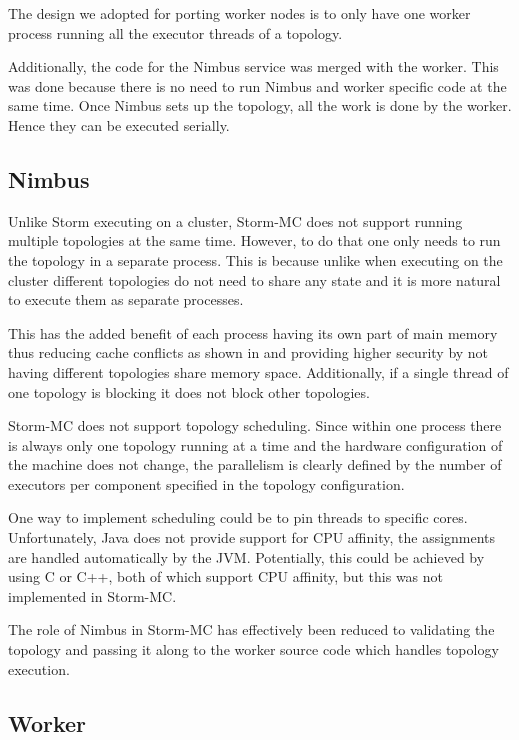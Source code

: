 The design we adopted for porting worker nodes is to only have one worker process running all the executor threads of a topology.

Additionally, the code for the Nimbus service was merged with the worker. This was done because there is no need to run Nimbus and worker specific code at the same time. Once Nimbus sets up the topology, all the work is done by the worker. Hence they can be executed serially.

\subsection{Nimbus}

Unlike Storm executing on a cluster, Storm-MC does not support running multiple topologies at the same time. However, to do that one only needs to run the topology in a separate process. This is because unlike when executing on the cluster different topologies do not need to share any state and it is more natural to execute them as separate processes.

This has the added benefit of each process having its own part of main memory thus reducing cache conflicts as shown in \citep{Chandra:2005:PIC:1042442.1043432} and providing higher security by not having different topologies share memory space. Additionally, if a single thread of one topology is blocking it does not block other topologies.

Storm-MC does not support topology scheduling. Since within one process there is always only one topology running at a time and the hardware configuration of the machine does not change, the parallelism is clearly defined by the number of executors per component specified in the topology configuration.

One way to implement scheduling could be to pin threads to specific cores. Unfortunately, Java does not provide support for CPU affinity, the assignments are handled automatically by the JVM. Potentially, this could be achieved by using C or C++, both of which support CPU affinity, but this was not implemented in Storm-MC.

The role of Nimbus in Storm-MC has effectively been reduced to validating the topology and passing it along to the worker source code which handles topology execution.

\subsection{Worker}

